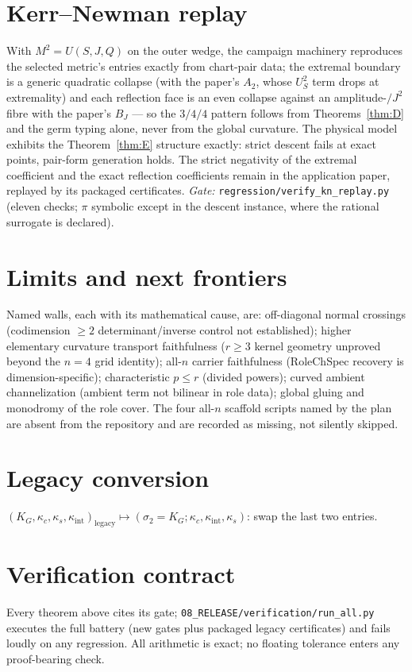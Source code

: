 \documentclass[11pt]{article}
\theoremstyle{definition}
\newcommand{\kc}{\kappa_c}
\newcommand{\ki}{\kappa_{\mathrm{int}}}
\newcommand{\ks}{\kappa_s}
\begin{document}
\section{Kerr--Newman replay}
With $M^2=U(S,J,Q)$ on the outer wedge, the campaign machinery reproduces the
selected metric's entries exactly from chart-pair data; the extremal boundary is a
generic quadratic collapse (with the paper's $A_2$, whose $U_S^2$ term drops at
extremality) and each reflection face is an even collapse against an
amplitude-$/J^2$ fibre with the paper's $B_J$ --- so the $3/4/4$ pattern follows
from Theorems~\ref{thm:D} and the germ typing alone, never from the global
curvature. The physical model exhibits the Theorem~\ref{thm:E} structure exactly:
strict descent fails at exact points, pair-form generation holds. The strict
negativity of the extremal coefficient and the exact reflection coefficients
remain in the application paper, replayed by its packaged certificates.
\emph{Gate:} \texttt{regression/verify\_kn\_replay.py} (eleven checks; $\pi$
symbolic except in the descent instance, where the rational surrogate is declared).

\section{Limits and next frontiers}
Named walls, each with its mathematical cause, are: off-diagonal normal crossings
(codimension $\ge2$ determinant/inverse control not established); higher elementary
curvature transport faithfulness ($r\ge3$ kernel geometry unproved beyond the
$n=4$ grid identity); all-$n$ carrier faithfulness (RoleChSpec recovery is
dimension-specific); characteristic $p\le r$ (divided powers); curved ambient
channelization (ambient term not bilinear in role data); global gluing and
monodromy of the role cover. The four all-$n$ scaffold scripts named by the plan
are absent from the repository and are recorded as missing, not silently skipped.

\appendix
\section{Legacy conversion}
$(K_G,\kc,\ks,\ki)_{\mathrm{legacy}}\mapsto(\sigma_2{=}K_G;\kc,\ki,\ks)$: swap the
last two entries.

\section{Verification contract}
Every theorem above cites its gate; \texttt{08\_RELEASE/verification/run\_all.py}
executes the full battery (new gates plus packaged legacy certificates) and fails
loudly on any regression. All arithmetic is exact; no floating tolerance enters any
proof-bearing check.
\end{document}
